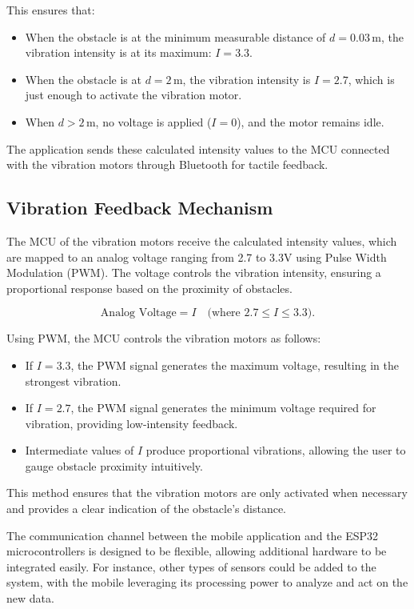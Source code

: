 This ensures that:
\begin{itemize}
	\item When the obstacle is at the minimum measurable distance of \(d = 0.03 \, \text{m}\), the vibration intensity is at its maximum: \(I = 3.3\).
	\item When the obstacle is at \(d = 2 \, \text{m}\), the vibration intensity is \(I = 2.7\), which is just enough to activate the vibration motor.
	\item When \(d > 2 \, \text{m}\), no voltage is applied (\(I = 0\)), and the motor remains idle.
\end{itemize}

The application sends these calculated intensity values to the MCU connected with the vibration motors through Bluetooth for tactile feedback.

\subsection{Vibration Feedback Mechanism}

The MCU of the vibration motors receive the calculated intensity values, which are mapped to an analog voltage ranging from 2.7 to 3.3V using Pulse Width Modulation (PWM). The voltage controls the vibration intensity, ensuring a proportional response based on the proximity of obstacles.

\[
\text{Analog Voltage} = I \quad \text{(where \(2.7 \leq I \leq 3.3\))}.
\]

Using PWM, the MCU controls the vibration motors as follows:
\begin{itemize}
	\item If \(I = 3.3\), the PWM signal generates the maximum voltage, resulting in the strongest vibration.
	\item If \(I = 2.7\), the PWM signal generates the minimum voltage required for vibration, providing low-intensity feedback.
	\item Intermediate values of \(I\) produce proportional vibrations, allowing the user to gauge obstacle proximity intuitively.
\end{itemize}

This method ensures that the vibration motors are only activated when necessary and provides a clear indication of the obstacle's distance.

The communication channel between the mobile application and the ESP32 microcontrollers is designed to be flexible, allowing additional hardware to be integrated easily. For instance, other types of sensors could be added to the system, with the mobile leveraging its processing power to analyze and act on the new data.